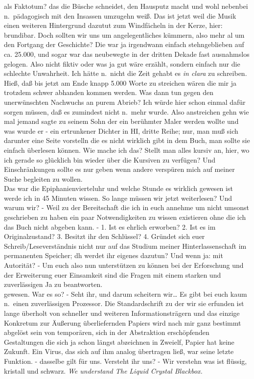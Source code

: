 \documentclass[
]{article}
\begin{document}
\begin{itemize}
  als Faktotum? das die Büsche schneidet, den Hausputz macht und wohl
  nebenbei n.~pädagogisch mit den Insassen umzugehn weiß. Das ist jetzt
  weil die Musik einen weiteren Hintergrund dazutut zum Windfächeln in
  der Kerze, hier: brundibar. Doch sollten wir uns um angelegentliches
  kümmern, also mehr al um den Fortgang der Geschichte? Die war ja
  irgendwann einfach stehngeblieben auf ca. 25.000, und sogar war das
  neubewegte in der dritten Dekade fast ausnahmslos gelogen. Also nicht
  fiktiv oder was ja gut wäre erzählt, sondern einfach nur die schlechte
  Unwahrheit. Ich hätte n.~nicht die Zeit gehabt es \emph{in clara} zu
  schreiben. Hieß, daß bis jetzt am Ende knapp 5.000 Worte zu streichen
  wären die mir ja trotzdem schwer abhanden kommen werden. Was dann tun
  gegen den unerwünschten Nachwuchs an purem Abrieb? Ich würde hier
  schon einmal dafür sorgen müssen, daß es zumindest nicht n.~mehr
  wurde. Also anstreichen gehn wie mal jemand sagte zu seinem Sohn der
  ein berühmter Maler werden wollte und was wurde er - ein ertrunkener
  Dichter in HI, dritte Reihe; nur, man muß sich darunter eine Seite
  vorstelln die es nicht wirklich gibt in dem Buch, man sollte sie
  einfach überlesen können. Wie mache ich das? Stellt man alles kursiv
  an, hier, wo ich gerade so glücklich bin wieder über die Kursiven zu
  verfügen? Und Einschränkungen sollte es nur geben wenn andere
  verspüren mich auf meiner Suche begleiten zu wollen.\\
  Das war die Epiphanienvierteluhr und welche Stunde es wirklich gewesen
  ist werde ich in 45 Minuten wissen. So lange müssen wir jetzt
  weiterlesen? Und warum wir? - Weil zu der Bereitschaft die ich in euch
  annehme um nicht umsonst geschrieben zu haben ein paar Notwendigkeiten
  zu wissen existieren ohne die ich das Buch nicht abgeben kann. - 1.
  Ist es ehrlich erworben? 2. Ist es im Originalzustand? 3. Besitzt ihr
  den Schlüssel? 4. Gründet sich euer Schreib/Leseverständnis nicht nur
  auf das Studium meiner Hinterlassenschaft im permanenten Speicher; dh
  werdet ihr eigenes dazutun? Und wenn ja: mit Autorität? - Um euch also
  nun unterstützen zu können bei der Erforschung und der Erweiterung
  euer Einsamkeit sind die Fragen mit einem starken und zuverlässigen Ja
  zu beantworten.\\
  gewesen. War es so? - Seht ihr, und darum scheitern wir\ldots{} Es
  gibt bei euch kaum n.~einen zuverlässigen Prozessor. Die
  Standardschrift zu der wir sie erfunden ist lange überholt von
  schneller und weiteren Informationsträgern und das einzige Konkretum
  zur Äußerung überliefernden Papiers wird nach mir ganz bestimmt
  abgelöst sein von temporären, sich in der Abstraktion erschöpfenden
  Gestaltungen die sich ja schon längst abzeichnen in Zweielf, Papier
  hat keine Zukunft. Ein Virus, das sich auf ihm analog übertragen ließ,
  war seine letzte Funktion. - dasselbe gilt für uns. Versteht ihr uns?
  - Wir verstehn was ist flüssig, kristall und schwarz. \emph{We
  understand The Liquid Crystal Blackbox.}
\end{itemize}
\end{document}
